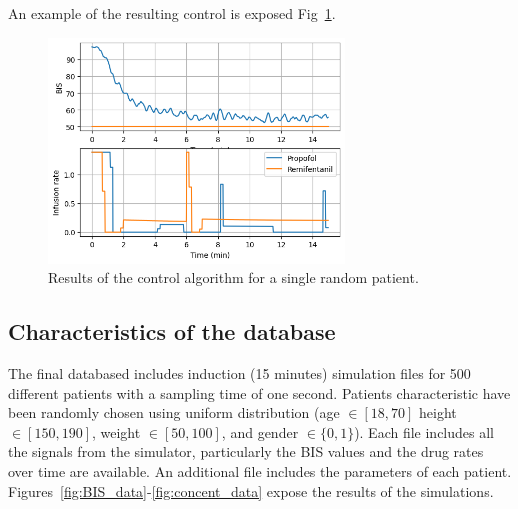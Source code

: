 An example of the resulting control is exposed Fig~\ref{fig:test_control}.

\begin{figure}
\center
\includegraphics[width=0.7\textwidth]{images/test_control.png}
\caption{Results of the control algorithm for a single random patient.}
\label{fig:test_control}
\end{figure}

\subsection{Characteristics of the database}

The final databased includes induction (15 minutes) simulation files for 500 different patients with a sampling time of one second. Patients characteristic have been randomly chosen using uniform distribution (age $\in [18,70]$ height $ \in [150, 190]$, weight $\in[50,100]$, and gender $\in \{0,1\}$). Each file includes all the signals from the simulator, particularly the BIS values and the drug rates over time are available. An additional file includes the parameters of each patient. Figures~\ref{fig:BIS_data}-\ref{fig:concent_data} expose the results of the simulations.


